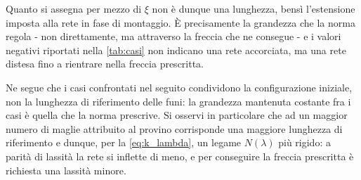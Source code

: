 Quanto si assegna per mezzo di $\xi$ non è dunque una lunghezza, bensì l'estensione imposta alla rete in fase di montaggio. È precisamente la grandezza che la norma regola - non direttamente, ma attraverso la freccia che ne consegue - e i valori negativi riportati nella \cref{tab:casi} non indicano una rete accorciata, ma una rete distesa fino a rientrare nella freccia prescritta.

Ne segue che i casi confrontati nel seguito condividono la configurazione iniziale, non la lunghezza di riferimento delle funi: la grandezza mantenuta costante fra i casi è quella che la norma prescrive. Si osservi in particolare che ad un maggior numero di maglie attribuito al provino corrisponde una maggiore lunghezza di riferimento e dunque, per la \eqref{eq:k_lambda}, un legame $N(\lambda)$ più rigido: a parità di lassità la rete si inflette di meno, e per conseguire la freccia prescritta è richiesta una lassità minore.

